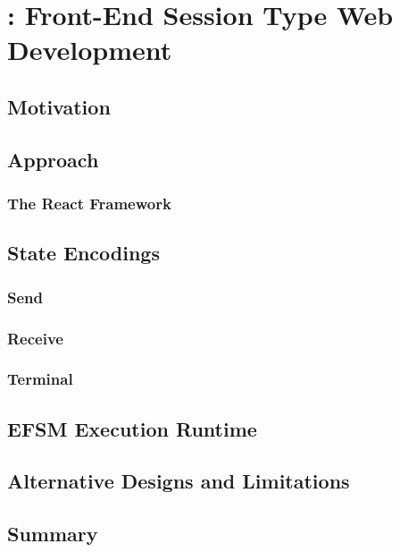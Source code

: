 \chapter{: Front-End Session Type Web Development}

\section{Motivation}

\section{Approach}

\subsection{The React Framework}

\section{State Encodings}

\subsection{Send}

\subsection{Receive}

\subsection{Terminal}

\section{EFSM Execution Runtime}

\section{Alternative Designs and Limitations}

\section{Summary}
